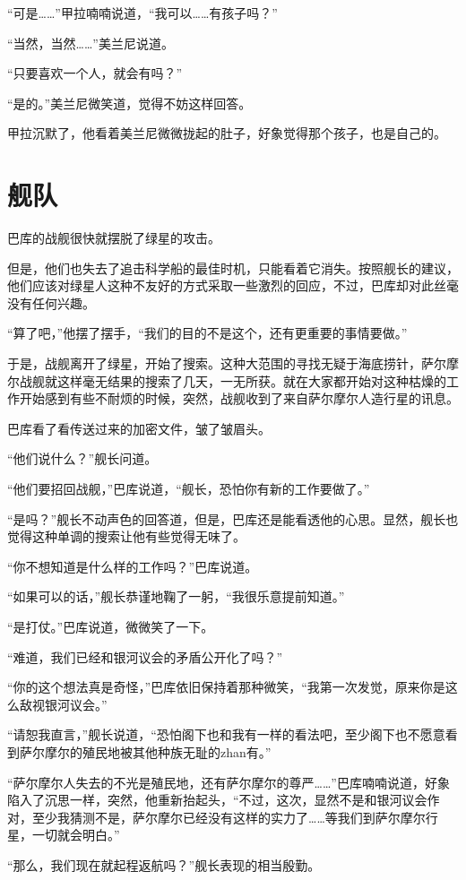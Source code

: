 “可是……”甲拉喃喃说道，“我可以……有孩子吗？” 

“当然，当然……”美兰尼说道。 

“只要喜欢一个人，就会有吗？” 

“是的。”美兰尼微笑道，觉得不妨这样回答。 

甲拉沉默了，他看着美兰尼微微拢起的肚子，好象觉得那个孩子，也是自己的。 

\chapter{舰队}

巴库的战舰很快就摆脱了绿星的攻击。 

但是，他们也失去了追击科学船的最佳时机，只能看着它消失。按照舰长的建议，他们应该对绿星人这种不友好的方式采取一些激烈的回应，不过，巴库却对此丝毫没有任何兴趣。 

“算了吧，”他摆了摆手，“我们的目的不是这个，还有更重要的事情要做。” 

于是，战舰离开了绿星，开始了搜索。这种大范围的寻找无疑于海底捞针，萨尔摩尔战舰就这样毫无结果的搜索了几天，一无所获。就在大家都开始对这种枯燥的工作开始感到有些不耐烦的时候，突然，战舰收到了来自萨尔摩尔人造行星的讯息。 

巴库看了看传送过来的加密文件，皱了皱眉头。 

“他们说什么？”舰长问道。 

“他们要招回战舰，”巴库说道，“舰长，恐怕你有新的工作要做了。” 

“是吗？”舰长不动声色的回答道，但是，巴库还是能看透他的心思。显然，舰长也觉得这种单调的搜索让他有些觉得无味了。 

“你不想知道是什么样的工作吗？”巴库说道。 

“如果可以的话，”舰长恭谨地鞠了一躬，“我很乐意提前知道。” 

“是打仗。”巴库说道，微微笑了一下。 

“难道，我们已经和银河议会的矛盾公开化了吗？” 

“你的这个想法真是奇怪，”巴库依旧保持着那种微笑，“我第一次发觉，原来你是这么敌视银河议会。” 

“请恕我直言，”舰长说道，“恐怕阁下也和我有一样的看法吧，至少阁下也不愿意看到萨尔摩尔的殖民地被其他种族无耻的zhan有。” 

“萨尔摩尔人失去的不光是殖民地，还有萨尔摩尔的尊严……”巴库喃喃说道，好象陷入了沉思一样，突然，他重新抬起头，“不过，这次，显然不是和银河议会作对，至少我猜测不是，萨尔摩尔已经没有这样的实力了……等我们到萨尔摩尔行星，一切就会明白。” 

“那么，我们现在就起程返航吗？”舰长表现的相当殷勤。 

